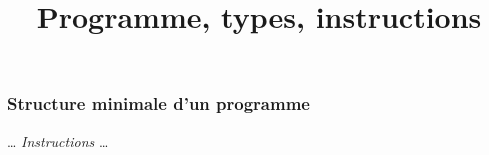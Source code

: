 

\title{Programme, types, instructions}



\frame{\titlepage}

\begin{frame}[fragile]
\frametitle{Structure minimale d'un programme}

\begin{semiverbatim}
         \dots
         \textit{Instructions}
         \dots\thecode{
    \}
\}}
\end{semiverbatim}
\end{frame}



